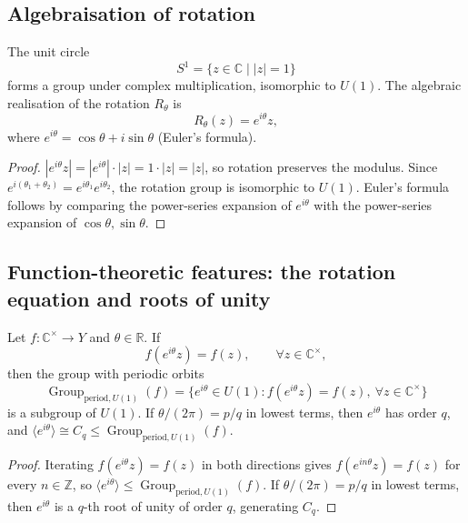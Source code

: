 \subsection{\texorpdfstring{Algebraisation of rotation}{Algebraisation of rotation}}

\begin{theorem}\label{thm:complex_rotation_algebraization}
The unit circle
\[
S^1 = \{z \in \mathbb{C} \mid |z| = 1\}
\]
forms a group under complex multiplication, isomorphic to $U(1)$. The algebraic realisation of the rotation $R_\theta$ is
\[
R_\theta(z) = e^{i\theta} z,
\]
where $e^{i\theta} = \cos\theta + i\sin\theta$ (Euler's formula).
\end{theorem}

\begin{proof}
$|e^{i\theta} z| = |e^{i\theta}| \cdot |z| = 1 \cdot |z| = |z|$, so rotation preserves the modulus. Since $e^{i(\theta_1 + \theta_2)} = e^{i\theta_1} e^{i\theta_2}$, the rotation group is isomorphic to $U(1)$. Euler's formula follows by comparing the power-series expansion of $e^{i\theta}$ with the power-series expansion of $\cos\theta, \sin\theta$.
\end{proof}

\subsection{\texorpdfstring{Function-theoretic features: the rotation equation and roots of unity}{Function-theoretic features: the rotation equation and roots of unity}}

\begin{theorem}\label{thm:rotation_equation_C}
Let $f:\mathbb{C}^\times\to Y$ and $\theta\in\mathbb{R}$. If
\[
f(e^{i\theta}z)=f(z),\qquad \forall z\in\mathbb{C}^\times,
\]
then the group with periodic orbits
\[
\operatorname{Group}_{\mathrm{period},U(1)}(f)=\{e^{i\theta}\in U(1): f(e^{i\theta}z)=f(z),\ \forall z\in\mathbb{C}^\times\}
\]
is a subgroup of $U(1)$. If $\theta/(2\pi)=p/q$ in lowest terms, then $e^{i\theta}$ has order $q$, and $\langle e^{i\theta}\rangle\cong C_q\le\operatorname{Group}_{\mathrm{period},U(1)}(f)$.
\end{theorem}

\begin{proof}
Iterating $f(e^{i\theta}z)=f(z)$ in both directions gives $f(e^{in\theta}z)=f(z)$ for every $n\in\mathbb{Z}$, so $\langle e^{i\theta}\rangle\le\operatorname{Group}_{\mathrm{period},U(1)}(f)$. If $\theta/(2\pi)=p/q$ in lowest terms, then $e^{i\theta}$ is a $q$-th root of unity of order $q$, generating $C_q$.
\end{proof}

